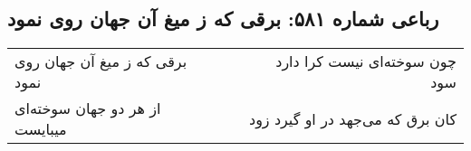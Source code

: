 \begin{center}
\section*{رباعی شماره ۵۸۱: برقی که ز میغ آن جهان روی نمود}
\label{sec:0581}
\begin{longtable}{l p{0.5cm} r}
برقی که ز میغ آن جهان روی نمود
&&
چون سوخته‌ای نیست کرا دارد سود
\\
از هر دو جهان سوخته‌ای میبایست
&&
کان برق که می‌جهد در او گیرد زود
\\
\end{longtable}
\end{center}
